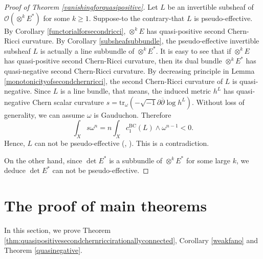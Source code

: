 \documentclass[11pt]{amsart}
\newcommand\sO{{\mathscr O}}
\newcommand\bp{{\bar\partial}}
\theoremstyle{plain}
\theoremstyle{definition}
\newcommand{\sq}{\sqrt{-1}}
\newcommand{\p}{\partial}
\renewcommand{\bar}{\overline}
\newcommand{\beq}{\begin{equation}}
\newcommand{\eeq}{\end{equation}}
\renewcommand{\bp}{\bar{\partial}}
\newcommand{\ts}{\otimes}
\renewcommand{\>}{\rightarrow}
\numberwithin{equation}{section} %
\begin{document}
	
	

	
	
\begin{proof}[Proof of Theorem \ref{vanishingforquasipositive}]
	Let $L$ be an invertible subsheaf of $\sO(\ts^k E^*)$ for some
	$k\geq 1$. Suppose-to the contrary-that $L$ is pseudo-effective. By
	Corollary \ref{functorialforsecondricci}, $\ts^k E$ has
	quasi-positive second Chern-Ricci curvature. By Corollary
	\ref{subsheafsubbundle}, the pseudo-effective invertible subsheaf
	$L$ is actually a line subbundle of $\ts^k E^*$. It is easy to see
	that if $\ts^k E$ has quasi-positive second Chern-Ricci curvature,
	then its dual bundle  $\ts^k E^*$ has quasi-negative second
	Chern-Ricci curvature. By decreasing principle in Lemma
	\ref{monotonicityofsecondchernricci}, the second Chern-Ricci
	curvature of $L$ is quasi-negative. Since $L$ is a line bundle,
	that means, the induced metric $h^L$  has quasi-negative Chern
	scalar curvature $s=\mathrm{tr}_\omega (-\sq\p\bp\log h^L)$. Without
	loss of generality, we can assume $\omega$ is Gauduchon. Therefore \beq
	\int_X s\omega^n=n \int_X c_1^{\mathrm{BC}}(L)\wedge
	\omega^{n-1}<0.\eeq  Hence, $L$ can not be
	pseudo-effective (\cite[Proposition~3.1]{Yang2019CM}, ). This is a contradiction.
	
	On the other hand, since $\det E^*$ is a subbundle of $\ts^k E^*$ for some large $k$, we deduce $\det E^*$ can not be pseudo-effective. \end{proof}
	
	
	
	\baselineskip
	
	
	\section{The proof of main theorems}
	
	
	
In this section, we prove Theorem \ref{thm:quasipositivesecondchernriccirationallyconnected}, Corollary \ref{weakfano} and Theorem \ref{quasinegative}.
	
\end{document}
